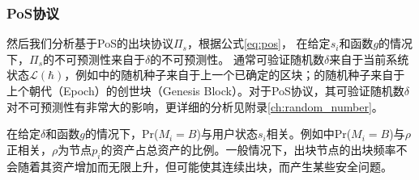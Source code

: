 \subsubsection{PoS协议}

然后我们分析基于PoS的出块协议$\Pi_s$，根据公式\ref{eq:pos}，%
在给定$s_i$和函数$g$的情况下，$\Pi_s$的不可预测性来自于$\delta$的不可预测性。%
通常可验证随机数$\delta$来自于当前系统状态$\mathcal{L}(\hbar)$，例如\cite{gilad2017algorand}中的随机种子来自于上一个已确定的区块；\cite{david2018ouroboros}的随机种子来自于上个朝代（Epoch）的创世块（Genesis Block）。对于PoS协议，其可验证随机数$\delta$对不可预测性有非常大的影响，更详细的分析见附录\ref{ch:random_number}。



在给定$\delta$和函数$g$的情况下，Pr($M_i=B$)与用户状态$s_i$相关。例如\cite{gilad2017algorand}中Pr($M_i=B$)与$\rho$正相关，$\rho$为节点$p_i$的资产占总资产的比例。一般情况下，出块节点的出块频率不会随着其资产增加而无限上升，但可能使其连续出块，而产生某些安全问题\cite{david2018ouroboros}。








